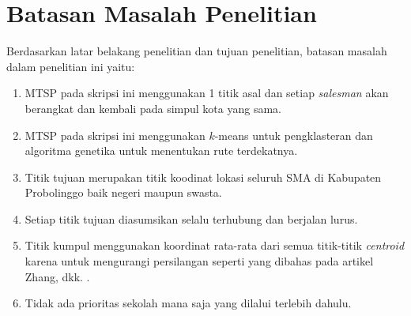 \section{Batasan Masalah Penelitian}

Berdasarkan latar belakang penelitian dan tujuan penelitian, batasan masalah dalam penelitian ini yaitu:

\begin{enumerate}
	\item MTSP pada skripsi ini menggunakan 1 titik asal dan setiap \textit{salesman} akan berangkat dan kembali pada simpul kota yang sama.
	\item MTSP pada skripsi ini menggunakan $k$-means untuk pengklasteran dan algoritma genetika untuk menentukan rute terdekatnya.
	\item Titik tujuan merupakan titik koodinat lokasi seluruh SMA di Kabupaten Probolinggo baik negeri maupun swasta.
	\item Setiap titik tujuan diasumsikan selalu terhubung dan berjalan lurus.
	\item Titik kumpul menggunakan koordinat rata-rata dari semua titik-titik \textit{centroid} karena untuk mengurangi persilangan seperti yang dibahas pada artikel Zhang, dkk. \cite{inproceedings}.
	\item Tidak ada prioritas sekolah mana saja yang dilalui terlebih dahulu.
\end{enumerate}